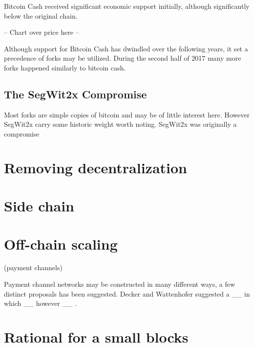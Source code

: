 Bitcoin Cash received significant economic support initially, although significantly below the original chain.


-- Chart over price here --


Although support for Bitcoin Cash has dwindled over the following years, it set a precedence of forks may be utilized. During the second half of 2017 many more forks happened similarly to bitcoin cash.

\subsection{The SegWit2x Compromise}

Most forks are simple copies of bitcoin and may be of little interest here. However SegWit2x carry some historic weight worth noting. 
SegWit2x was originally a compromise 


\section{Removing decentralization}

\section{Side chain}

\section{Off-chain scaling}

(payment channels)

Payment channel networks may be constructed in many different ways, a few distinct proposals has been suggested. Decker and Wattenhofer suggested a \_\_ in which \_\_ however \_\_ \cite{decker:wattenhofer:duplex}.  

\section{Rational for a small blocks}
